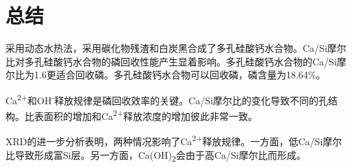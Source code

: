 \documentclass[11pt]{article}
\begin{document}
\section{总结}
\label{sec:org4f8c39c}
\setlength{\parindent}{1.0cm}
采用动态水热法，采用碳化物残渣和白炭黑合成了多孔硅酸钙水合物。Ca/Si摩尔比对多孔硅酸钙水合物的磷回收性能产生显着影响。多孔硅酸钙水合物的Ca/Si摩尔比为1.6更适合回收磷。多孔硅酸钙水合物可以回收磷，磷含量为18.64\%。
\par


\setlength{\parindent}{1.0cm}
Ca\textsuperscript{2+}和OH\textsuperscript{-}释放规律是磷回收效率的关键。Ca/Si摩尔比的变化导致不同的孔结构。比表面积的增加和Ca\textsuperscript{2+}释放浓度的增加彼此非常一致。
\par


\setlength{\parindent}{1.0cm}
XRD的进一步分析表明，两种情况影响了Ca\textsuperscript{2+}释放规律。一方面，低Ca/Si摩尔比导致形成富Si层。另一方面，Ca(OH)\textsubscript{2}会由于高Ca/Si摩尔比而形成。
\par




\end{document}
